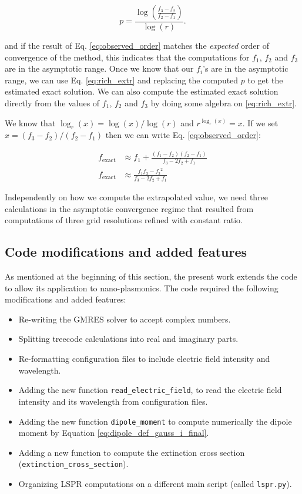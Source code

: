 \begin{equation} \label{eq:observed_order}
   p = \frac{\log \left( \frac{f_3 - f_2}{f_2-f_1} \right)}{\log (r)}.
\end{equation}
   
and if the result of Eq. \eqref{eq:observed_order} matches the \textit{expected} order of convergence
of the method, this indicates that the computations for $f_1$, $f_2$ and $f_3$ are in the asymptotic range.
Once we know that our $f_i$'s are in the asymptotic range, we can use Eq. \eqref{eq:rich_extr} and replacing
the computed $p$ to get the estimated exact solution. We can also compute the estimated exact solution
directly from the values of $f_1$, $f_2$ and $f_3$ by doing some algebra on \eqref{eq:rich_extr}.

We know that $\log_r(x) = \log(x)/\log(r)$ and $r^{\log_r(x)} = x$. If we set $x = (f_3 - f_2)/(f_2 -f_1)$ 
then we can write Eq. \eqref{eq:observed_order}:

\begin{align} \label{eq:rich_extr2}
   f_{\text{exact}} &\approx f_1 + \frac{(f_1 - f_2)(f_2 -f_1)}{f_3-2f_2+f_1} \\
   f_{\text{exact}} &\approx \frac{f_1f_3 -{f_2}^2}{f_3-2f_2+f_1}
\end{align} 

Independently on how we compute the extrapolated value, we need three
calculations in the asymptotic convergence regime that resulted from computations
of three grid resolutions refined with constant ratio.


\subsection{Code modifications and added features} \label{sec:code_imp}

As mentioned at the beginning of this section, the present work extends the \pygbe code
to allow its application to nano-plasmonics. 
The code required the following modifications and added features:

\begin{itemize}
    \item Re-writing the GMRES solver to accept complex numbers. 
    \item Splitting treecode calculations into real and imaginary parts.
    \item Re-formatting configuration files to include electric field intensity and  wavelength.
    \item Adding the new function \texttt{read\_electric\_field}, to read the electric field intensity and its wavelength from configuration files.
    \item Adding the new function \texttt{dipole\_moment} to compute numerically the dipole moment by Equation \eqref{eq:dipole_def_gauss_i_final}.
    \item Adding a new function to compute the extinction cross section (\texttt{extinction\_cross\_section}).
    \item Organizing LSPR computations on a different main script (called \texttt{lspr.py}).
\end{itemize}

